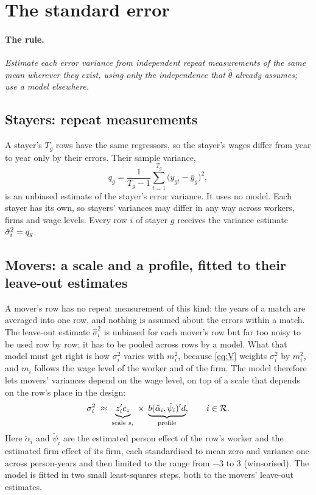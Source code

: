 \section{The standard error}\label{sec:estimator}

\paragraph{The rule.} \emph{Estimate each error variance from independent repeat measurements of the same mean
wherever they exist, using only the independence that $\hat\theta$ already assumes; use a model elsewhere.}

\subsection{Stayers: repeat measurements}

A stayer's $T_g$ rows have the same regressors, so the stayer's wages differ from year to year only by their
errors. Their sample variance,
\begin{equation}\label{eq:q}
q_g=\frac{1}{T_g-1}\sum_{t=1}^{T_g}\big(y_{gt}-\bar y_g\big)^2 ,
\end{equation}
is an unbiased estimate of the stayer's error variance. It uses no model. Each stayer has its own, so stayers'
variances may differ in any way across workers, firms and wage levels. Every row $i$ of stayer $g$ receives the
variance estimate $\tilde\sigma_i^2=q_g$.

\subsection{Movers: a scale and a profile, fitted to their leave-out estimates}\label{sec:transfer}

A mover's row has no repeat measurement of this kind: the years of a match are averaged into one row, and
nothing is assumed about the errors within a match. The leave-out estimate $\hat\sigma_i^2$ is unbiased for
each mover's row but far too noisy to be used row by row; it has to be pooled across rows by a model. What that
model must get right is how $\sigma_i^2$ varies with $m_i^2$, because \eqref{eq:V} weights $\sigma_i^2$ by
$m_i^2$, and $m_i$ follows the wage level of the worker and of the firm. The model therefore lets movers'
variances depend on the wage level, on top of a scale that depends on the row's place in the design:
\begin{equation}\label{eq:model}
\sigma_i^2\;\approx\;\underbrace{z_i'c_z}_{\text{scale }s_i}\;\times\;\underbrace{b(\tilde\alpha_i,\tilde\psi_i)'d}_{\text{profile}},\qquad i\in\mathcal{R} .
\end{equation}
Here $\tilde\alpha_i$ and $\tilde\psi_i$ are the estimated person effect of the row's worker and the estimated
firm effect of its firm, each standardised to mean zero and variance one across person-years and then limited
to the range from $-3$ to $3$ (winsorised). The model is fitted in two small least-squares steps, both to the
movers' leave-out estimates.

